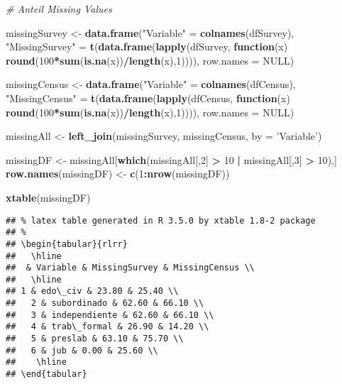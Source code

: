 \documentclass[]{article}
\newenvironment{Shaded}{\begin{snugshade}}{\end{snugshade}}
\newcommand{\KeywordTok}[1]{\textcolor[rgb]{0.13,0.29,0.53}{\textbf{#1}}}
\newcommand{\DataTypeTok}[1]{\textcolor[rgb]{0.13,0.29,0.53}{#1}}
\newcommand{\DecValTok}[1]{\textcolor[rgb]{0.00,0.00,0.81}{#1}}
\newcommand{\StringTok}[1]{\textcolor[rgb]{0.31,0.60,0.02}{#1}}
\newcommand{\CommentTok}[1]{\textcolor[rgb]{0.56,0.35,0.01}{\textit{#1}}}
\newcommand{\OtherTok}[1]{\textcolor[rgb]{0.56,0.35,0.01}{#1}}
\newcommand{\ControlFlowTok}[1]{\textcolor[rgb]{0.13,0.29,0.53}{\textbf{#1}}}
\newcommand{\OperatorTok}[1]{\textcolor[rgb]{0.81,0.36,0.00}{\textbf{#1}}}
\newcommand{\NormalTok}[1]{#1}
\begin{document}
\begin{Shaded}
\begin{Highlighting}[]
\CommentTok{# Anteil Missing Values}

\NormalTok{missingSurvey <-}\StringTok{ }\KeywordTok{data.frame}\NormalTok{(}\StringTok{"Variable"}\NormalTok{ =}\StringTok{ }\KeywordTok{colnames}\NormalTok{(dfSurvey), }\StringTok{"MissingSurvey"}\NormalTok{ =}\StringTok{ }\KeywordTok{t}\NormalTok{(}\KeywordTok{data.frame}\NormalTok{(}\KeywordTok{lapply}\NormalTok{(dfSurvey, }\ControlFlowTok{function}\NormalTok{(x) }\KeywordTok{round}\NormalTok{(}\DecValTok{100}\OperatorTok{*}\KeywordTok{sum}\NormalTok{(}\KeywordTok{is.na}\NormalTok{(x))}\OperatorTok{/}\KeywordTok{length}\NormalTok{(x),}\DecValTok{1}\NormalTok{)))), }\DataTypeTok{row.names =} \OtherTok{NULL}\NormalTok{)}

\NormalTok{missingCensus <-}\StringTok{ }\KeywordTok{data.frame}\NormalTok{(}\StringTok{"Variable"}\NormalTok{ =}\StringTok{ }\KeywordTok{colnames}\NormalTok{(dfCensus), }\StringTok{"MissingCensus"}\NormalTok{ =}\StringTok{ }\KeywordTok{t}\NormalTok{(}\KeywordTok{data.frame}\NormalTok{(}\KeywordTok{lapply}\NormalTok{(dfCensus, }\ControlFlowTok{function}\NormalTok{(x) }\KeywordTok{round}\NormalTok{(}\DecValTok{100}\OperatorTok{*}\KeywordTok{sum}\NormalTok{(}\KeywordTok{is.na}\NormalTok{(x))}\OperatorTok{/}\KeywordTok{length}\NormalTok{(x),}\DecValTok{1}\NormalTok{)))), }\DataTypeTok{row.names =} \OtherTok{NULL}\NormalTok{)}

\NormalTok{missingAll <-}\StringTok{ }\KeywordTok{left_join}\NormalTok{(missingSurvey, missingCensus, }\DataTypeTok{by =} \StringTok{'Variable'}\NormalTok{)}

\NormalTok{missingDF <-}\StringTok{ }\NormalTok{missingAll[}\KeywordTok{which}\NormalTok{(missingAll[,}\DecValTok{2}\NormalTok{] }\OperatorTok{>}\StringTok{ }\DecValTok{10} \OperatorTok{|}\StringTok{ }\NormalTok{missingAll[,}\DecValTok{3}\NormalTok{] }\OperatorTok{>}\StringTok{ }\DecValTok{10}\NormalTok{),]}
\KeywordTok{row.names}\NormalTok{(missingDF) <-}\StringTok{ }\KeywordTok{c}\NormalTok{(}\DecValTok{1}\OperatorTok{:}\KeywordTok{nrow}\NormalTok{(missingDF))}

\KeywordTok{xtable}\NormalTok{(missingDF)}
\end{Highlighting}
\end{Shaded}

\begin{verbatim}
## % latex table generated in R 3.5.0 by xtable 1.8-2 package
## % 
## \begin{tabular}{rlrr}
##   \hline
##  & Variable & MissingSurvey & MissingCensus \\ 
##   \hline
## 1 & edo\_civ & 23.80 & 25.40 \\ 
##   2 & subordinado & 62.60 & 66.10 \\ 
##   3 & independiente & 62.60 & 66.10 \\ 
##   4 & trab\_formal & 26.90 & 14.20 \\ 
##   5 & preslab & 63.10 & 75.70 \\ 
##   6 & jub & 0.00 & 25.60 \\ 
##    \hline
## \end{tabular}
\end{verbatim}
\end{document}
